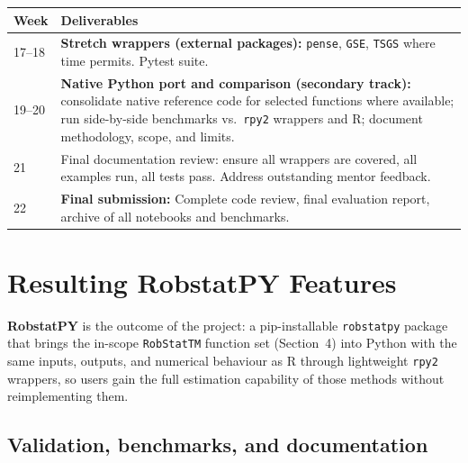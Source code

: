 \documentclass[11pt, a4paper]{article}
\begin{document}
\begin{tabularx}{\linewidth}{@{} l X @{}}
  \toprule
  \textbf{Week} & \textbf{Deliverables} \\
  \midrule
  17--18 & \textbf{Stretch wrappers (external packages):}
     \texttt{pense}, \texttt{GSE}, \texttt{TSGS} where time permits.
     Pytest suite. \\
  19--20 & \textbf{Native Python port and comparison (secondary track):}
     consolidate native reference code for selected functions where
     available; run side-by-side benchmarks vs.\ \texttt{rpy2} wrappers
     and R; document methodology, scope, and limits. \\
  21 & Final documentation review: ensure all wrappers are covered,
     all examples run, all tests pass. Address outstanding
     mentor feedback. \\
  22 & \textbf{Final submission:}
     Complete code review, final evaluation report, archive of all
     notebooks and benchmarks. \\
  \bottomrule
\end{tabularx}

\section{Resulting RobstatPY Features}
\label{sec:resulting-robstatpy}

\noindent
\textbf{RobstatPY} is the outcome of the project: a pip-installable
\texttt{robstatpy} package that brings the in-scope \texttt{RobStatTM}
function set (Section~4) into Python with the same inputs, outputs, and
numerical behaviour as R through lightweight \texttt{rpy2} wrappers, so
users gain the full estimation capability of those methods without
reimplementing them.

\subsection{Validation, benchmarks, and documentation}
\end{document}
